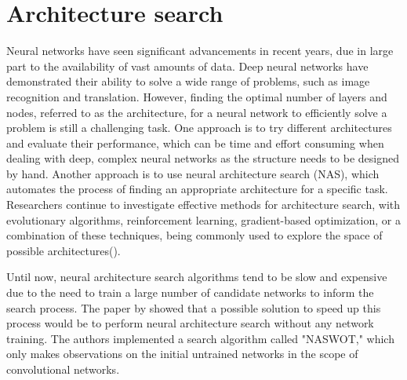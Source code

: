 \section{Architecture search}

Neural networks have seen significant advancements in recent years, due in large part to the availability of vast amounts of data. Deep neural networks have demonstrated their ability to solve a wide range of problems, such as image recognition and translation. However, finding the optimal number of layers and nodes, referred to as the architecture, for a neural network to efficiently solve a problem is still a challenging task. One approach is to try different architectures and evaluate their performance, which can be time and effort consuming when dealing with deep, complex neural networks as the structure needs to be designed by hand. Another approach is to use neural architecture search (NAS), which automates the process of finding an appropriate architecture for a specific task. Researchers continue to investigate effective methods for architecture search, with evolutionary algorithms, reinforcement learning, gradient-based optimization, or a combination of these techniques, being commonly used to explore the space of possible architectures(\cite{elsken_neural_nodate}).

Until now, neural architecture search algorithms tend to be slow and expensive due to the need to train a large number of candidate networks to inform the search process. The paper by \cite{mellor_neural_nodate} showed that a possible solution to speed up this process would be to perform neural architecture search without any network training. The authors implemented a search algorithm called "NASWOT," which only makes observations on the initial untrained networks in the scope of convolutional networks.

